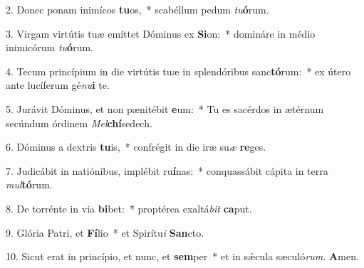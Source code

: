 \item 2. Donec ponam inimícos \textbf{tu}os,~* scabéllum pedum \textit{tu}\textbf{ó}rum.
\item 3. Virgam virtútis tuæ emíttet Dóminus ex \textbf{Si}on:~* domináre in médio inimicórum \textit{tu}\textbf{ó}rum.
\item 4. Tecum princípium in die virtútis tuæ in splendóribus sanc\textbf{tó}rum:~* ex útero ante lucíferum gé\hspace{0.03em}\textit{nu}\textbf{i} te.
\item 5. Jurávit Dóminus, et non pænitébit \textbf{e}um:~* Tu es sacérdos in ætérnum secúndum órdinem \textit{Mel}\textbf{chí}sedech.
\item 6. Dóminus a dextris \textbf{tu}is,~* confrégit in die iræ su\hspace{0.03em}\textit{æ} \textbf{re}ges.
\item 7. Judicábit in natiónibus, implébit ru\textbf{í}nas:~* conquassábit cápita in terra \textit{mul}\textbf{tó}rum.
\item 8. De torrénte in via \textbf{bi}bet:~* proptérea exaltá\hspace{0.03em}\textit{bit} \textbf{ca}put.
\item 9. Glória Patri, et \textbf{Fí}lio~* et Spirítu\textit{i} \textbf{San}cto.
\item 10. Sicut erat in princípio, et nunc, et \textbf{sem}per~* et in sǽcula sæculó\textit{rum.} \textbf{A}men.